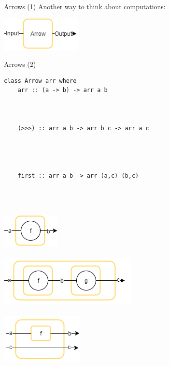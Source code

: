 \begin{frame}[fragile]{Arrows (1)}
\centering Another way to think about computations:
\begin{center}
	\includegraphics[scale=0.8]{images/arrow}~\\
\end{center}
\end{frame}

\begin{frame}[fragile]{Arrows (2)}
\begin{minipage}{0.6\textwidth}
\begin{lstlisting}[frame=htrbl, numbers=none]
class Arrow arr where
	arr :: (a -> b) -> arr a b
	
	
	
	(>>>) :: arr a b -> arr b c -> arr a c
	
	
	
	
	first :: arr a b -> arr (a,c) (b,c)
\end{lstlisting}
\vfill
\end{minipage}
\hspace*{0.03\textwidth}
\begin{minipage}{0.25\textwidth}
	~\\~\\~\\
	\includegraphics[scale=0.6]{images/arr}~\\~\\
	\includegraphics[scale=0.6]{images/compose}~\\~\\
	\includegraphics[scale=0.6]{images/first}~\\~\\
\end{minipage}
\end{frame}

